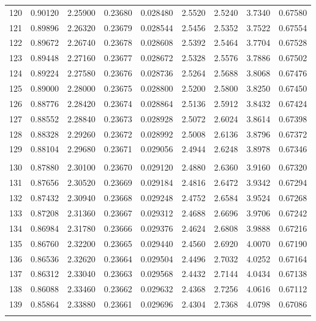 \documentclass[letter,twosides,10pt]{article}
\begin{document}
\begin{longtable}{|c|c|c|c|c|c|c|c|c|}
120 & 0.90120 & 2.25900 & 0.23680 & 0.028480 & 2.5520 & 2.5240 & 3.7340 & 0.67580 \\
121 & 0.89896 & 2.26320 & 0.23679 & 0.028544 & 2.5456 & 2.5352 & 3.7522 & 0.67554 \\
122 & 0.89672 & 2.26740 & 0.23678 & 0.028608 & 2.5392 & 2.5464 & 3.7704 & 0.67528 \\
123 & 0.89448 & 2.27160 & 0.23677 & 0.028672 & 2.5328 & 2.5576 & 3.7886 & 0.67502 \\
124 & 0.89224 & 2.27580 & 0.23676 & 0.028736 & 2.5264 & 2.5688 & 3.8068 & 0.67476 \\
125 & 0.89000 & 2.28000 & 0.23675 & 0.028800 & 2.5200 & 2.5800 & 3.8250 & 0.67450 \\
126 & 0.88776 & 2.28420 & 0.23674 & 0.028864 & 2.5136 & 2.5912 & 3.8432 & 0.67424 \\
127 & 0.88552 & 2.28840 & 0.23673 & 0.028928 & 2.5072 & 2.6024 & 3.8614 & 0.67398 \\
128 & 0.88328 & 2.29260 & 0.23672 & 0.028992 & 2.5008 & 2.6136 & 3.8796 & 0.67372 \\
129 & 0.88104 & 2.29680 & 0.23671 & 0.029056 & 2.4944 & 2.6248 & 3.8978 & 0.67346 \\
 & & & & & & & & \\
130 & 0.87880 & 2.30100 & 0.23670 & 0.029120 & 2.4880 & 2.6360 & 3.9160 & 0.67320 \\
131 & 0.87656 & 2.30520 & 0.23669 & 0.029184 & 2.4816 & 2.6472 & 3.9342 & 0.67294 \\
132 & 0.87432 & 2.30940 & 0.23668 & 0.029248 & 2.4752 & 2.6584 & 3.9524 & 0.67268 \\
133 & 0.87208 & 2.31360 & 0.23667 & 0.029312 & 2.4688 & 2.6696 & 3.9706 & 0.67242 \\
134 & 0.86984 & 2.31780 & 0.23666 & 0.029376 & 2.4624 & 2.6808 & 3.9888 & 0.67216 \\
135 & 0.86760 & 2.32200 & 0.23665 & 0.029440 & 2.4560 & 2.6920 & 4.0070 & 0.67190 \\
136 & 0.86536 & 2.32620 & 0.23664 & 0.029504 & 2.4496 & 2.7032 & 4.0252 & 0.67164 \\
137 & 0.86312 & 2.33040 & 0.23663 & 0.029568 & 2.4432 & 2.7144 & 4.0434 & 0.67138 \\
138 & 0.86088 & 2.33460 & 0.23662 & 0.029632 & 2.4368 & 2.7256 & 4.0616 & 0.67112 \\
139 & 0.85864 & 2.33880 & 0.23661 & 0.029696 & 2.4304 & 2.7368 & 4.0798 & 0.67086 \\
 & & & & & & & & \\

\end{longtable}
\end{document}
